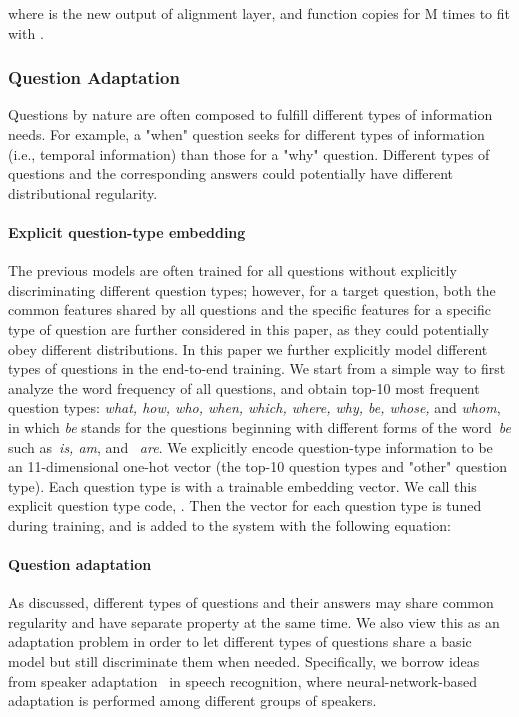 \documentclass{article}
\begin{document}
where  is the new output of alignment layer, and function  copies  for M times to fit with .

\subsubsection{Question Adaptation}
Questions by nature are often composed to fulfill different types of information needs. For example, a "when" question seeks for different types of information (i.e., temporal information) than those for a "why" question. Different types of questions and the corresponding answers could potentially have different distributional regularity. 

\paragraph{Explicit question-type embedding}
The previous models are often trained for all questions without explicitly discriminating different question types; however, for a target question, both the common features shared by all questions and the specific features for a specific type of question are further considered in this paper, as they could potentially obey different distributions. 
In this paper we further explicitly model different types of questions in the end-to-end training. We start from a simple way to first analyze the word frequency of all questions, and obtain top-10 most frequent question types: \textit{what, how, who, when, which, where, why, be, whose,} and \textit{whom}, in which \textit{be} stands for the questions beginning with different forms of the word~\textit{be} such as~\textit{is, am}, and ~\textit{are}. We explicitly encode question-type information to be an 11-dimensional one-hot vector (the top-10 question types and "other" question type). Each question type is with a trainable embedding vector. We call this explicit question type code, . Then the vector for each question type is tuned during training, and is added to the system with the following equation:



\paragraph{Question adaptation}
As discussed, different types of questions and their answers may share common regularity and have separate property at the same time. We also view this as an adaptation problem in order to let different types of questions share a basic model but still discriminate them when needed. Specifically, we borrow ideas from speaker adaptation~\citep{dehak2011front} in speech recognition, where neural-network-based adaptation is performed among different groups of speakers. 
\end{document}
